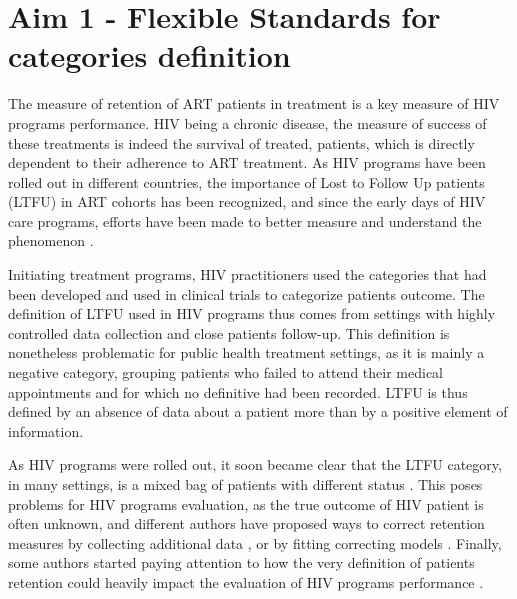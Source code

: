 \section[Flexible Standards]{Aim 1 - Flexible Standards for categories definition}

The measure of retention of ART patients in treatment is a key measure of HIV programs performance. HIV being a chronic disease, the measure of success of these treatments is indeed the survival of treated, patients, which is directly dependent to their adherence to ART treatment. As HIV programs have been rolled out in different countries, the importance of Lost to Follow Up patients (LTFU) in ART cohorts has been recognized, and since the early days of HIV care programs, efforts have been made to better measure and understand the phenomenon \cite{ioannidis_predictors_1999,lebouche_incidence_2006,moh_incidence_2007}.

Initiating treatment programs, HIV practitioners used the categories that had been developed and used in clinical trials to categorize patients outcome. The definition of LTFU used in HIV programs thus comes from settings with highly controlled data collection and close patients follow-up. This definition is nonetheless problematic for public health treatment settings, as it is mainly a negative category, grouping patients who failed to attend their medical appointments and for which no definitive had been recorded. LTFU is thus defined by an absence of data about a patient more than by a positive element of information.

As HIV programs were rolled out, it soon became clear that the LTFU category, in many settings, is a mixed bag of patients with different status \cite{kwong-leung_yu_true_2007,dalal_characteristics_2008,mcguire_vital_2010}. This poses problems for HIV programs evaluation, as the true outcome of HIV patient is often unknown, and different authors have proposed ways to correct retention measures by collecting additional data \cite{yiannoutsos_sampling-based_2008,geng_tracking_2010,tassie_evaluation_2010}, or by fitting correcting models \cite{brinkhof_adjusting_2010,egger_correcting_2011,van_cutsem_correcting_2011,henriques_comparison_2012,verguet_incorporating_2013}.
Finally, some authors started paying attention to how the very definition of patients retention could heavily impact the evaluation of HIV programs performance \cite{chi_empirical_2010,chi_universal_2011,fox_defining_2012,mugavero_measuring_2012,yehia_comparing_2012,grimsrud_impact_2013,shepherd_impact_2013}.

